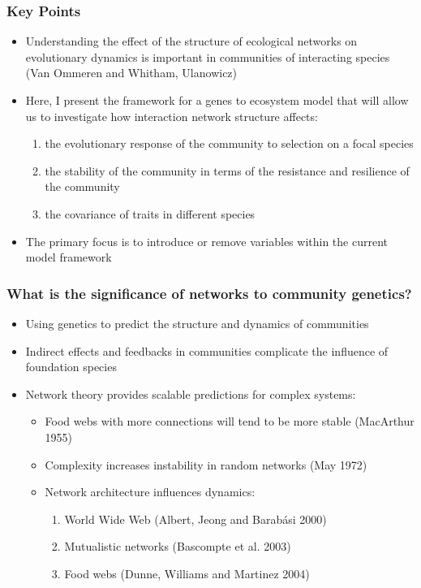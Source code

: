 \documentclass[serif,mathserif]{beamer}
\begin{document}
\begin{frame}
  \frametitle{Key Points}
  \begin{itemize}
  \item Understanding the effect of the structure of ecological
    networks on evolutionary dynamics is important in communities of
    interacting species (Van Ommeren and Whitham, Ulanowicz) \pause
  \item Here, I present the framework for a genes to ecosystem model
    that will allow us to investigate how interaction network 
    structure affects: \pause
    \begin{enumerate}
      \item the evolutionary response of the community to selection on
        a focal species \pause
      \item the stability of the community in terms of the resistance
        and resilience of the community \pause
      \item the covariance of traits in different species \pause
    \end{enumerate}
  \item The primary focus is to introduce or remove variables within
    the current model framework \pause
  \end{itemize}
\end{frame}


\begin{frame}
  \frametitle{What is the significance of networks to community genetics?}
  \begin{itemize}
  \item Using genetics to predict the structure and dynamics of communities  \pause
  \item Indirect effects and feedbacks in communities complicate the
    influence of foundation species \pause
  \item Network theory provides scalable predictions for complex
    systems: \pause
    \begin{itemize}
    \item Food webs with more connections will tend to be more stable
      (MacArthur 1955) \pause
    \item Complexity increases instability in random networks (May
      1972) \pause
    \item Network architecture influences dynamics:
      \begin{enumerate}
      \item World Wide Web (Albert, Jeong and Barab\'{a}si 2000) \pause
      \item Mutualistic networks (Bascompte et al. 2003) \pause
      \item Food webs (Dunne, Williams and Martinez 2004) \pause
      \end{enumerate}
    \end{itemize}
  \end{itemize}
\end{frame}
\end{document}
